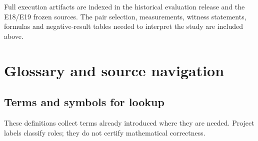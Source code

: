 Full execution artifacts are indexed in the historical evaluation release and the E18/E19 frozen sources. The pair selection, measurements, witness statements, formulas and negative-result tables needed to interpret the study are included above.

\section[Glossary and source navigation]{\texorpdfstring{\protect\hypertarget{appendix-e}{}Glossary and source navigation}{Glossary and source navigation}}
\subsection[Terms and symbols for lookup]{\texorpdfstring{\protect\hypertarget{e1}{}Terms and symbols for lookup}{Terms and symbols for lookup}}
These definitions collect terms already introduced where they are needed. Project labels classify roles; they do not certify mathematical correctness.

